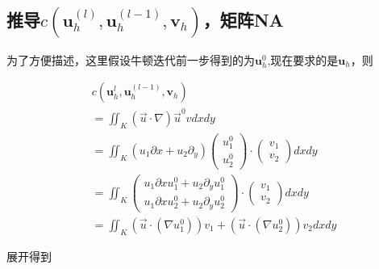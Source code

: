 \documentclass{ctexart}
\begin{document}
\subsection{推导$c(\mathbf{u}_h^{(l)}, \mathbf{u}_h^{(l-1)}, \mathbf{v}_h)$，矩阵NA}
为了方便描述，这里假设牛顿迭代前一步得到的为$\mathbf{u}_h^0$,现在要求的是$\mathbf{u}_h$，则

\begin{align*}
    & c(\mathbf{u}_h^{l}, \mathbf{u}_h^{(l-1)}, \mathbf{v}_h)\\
    & = \iint_K(\vec{u} \cdot \nabla) \vec{u}^0vdxdy \\
    & = \iint_K(u_1 \partial x + u_2 \partial _y)\begin{pmatrix}
     u_1^0\\
     u_2^0
    \end{pmatrix} \cdot \begin{pmatrix}
     v_1\\
    v_2
    \end{pmatrix}dxdy\\
    & = \iint_K\begin{pmatrix}
     u_1 \partial xu_1^0 + u_2 \partial _y u_1^0\\
     u_1 \partial xu_2^0 + u_2 \partial _y u_2^0
    \end{pmatrix} \cdot \begin{pmatrix}
     v_1\\
    v_2
    \end{pmatrix}dxdy\\
    & = \iint_K(\vec{u} \cdot (\nabla u_1^0) )v_1+(\vec{u} \cdot (\nabla u_2^0))v_2dxdy
\end{align*}

展开得到
\end{document}
